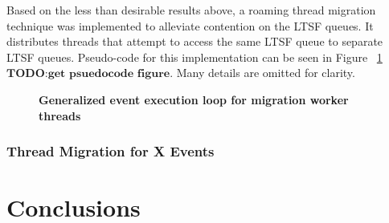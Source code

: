 \documentclass[a4paper]{article}
\begin{document}
Based on the less than desirable results above, a roaming thread migration
technique was implemented to alleviate contention on the LTSF queues.  It
distributes threads that attempt to access the same LTSF queue to separate LTSF
queues.  Pseudo-code for this implementation can be seen in Figure
~\ref{fig:thread_migration} \(\textbf{TODO:get psuedocode figure}\).  Many
details are omitted for clarity.\par

\begin{figure}[H]
    \centering
    \graphicspath{ {./data/} }
    \caption{\textbf{Generalized event execution loop for migration worker
    threads}}
    \label{fig:thread_migration}
\end{figure}

\subsubsection{\textbf{Thread Migration for X Events}}

\newpage
\section{\textbf{Conclusions}}








\newpage


\end{document}
